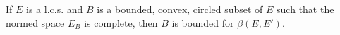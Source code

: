 If $E$ is a l.c.s. and $B$ is a bounded, convex, circled subset of $E$ such that the normed space $E_B$ is complete, then $B$ is bounded for $\beta(E, E')$.
